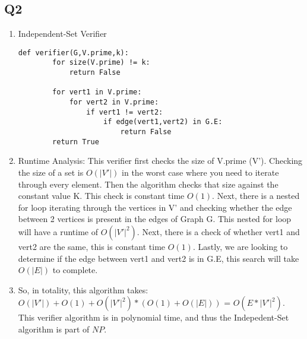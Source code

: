 \documentclass{article}
\begin{document}
\subsection*{Q2}
\begin{enumerate}[label=(\alph*)]
    \item Independent-Set Verifier
    \begin{lstlisting}[frame=single]
    def verifier(G,V.prime,k):
        for size(V.prime) != k:
            return False
        
        for vert1 in V.prime:
            for vert2 in V.prime:
                if vert1 != vert2:
                    if edge(vert1,vert2) in G.E:
                        return False
        return True
    \end{lstlisting}
    \item Runtime Analysis: This verifier first checks the size of V.prime (V'). Checking the size of a set is $O(|V'|)$ in the worst case where you need to iterate through every element. Then the algorithm checks that size against the constant value K. This check is constant time $O(1)$. Next, there is a nested for loop iterating through the vertices in V' and checking whether the edge between 2 vertices is present in the edges of Graph G. This nested for loop will have a runtime of $O(|V'|^{2})$. Next, there is a check of whether vert1 and vert2 are the same, this is constant time $O(1)$. Lastly, we are looking to determine if the edge between vert1 and vert2 is in G.E, this search will take $O(|E|)$ to complete. 
    \item So, in totality, this algorithm takes: $O(|V'|) + O(1) + O(|V'|^2) * (O(1)+O(|E|))$ = $O(E*|V'|^2)$. This verifier algorithm is in polynomial time, and thus the Indepedent-Set algorithm is part of $NP$.
\end{enumerate}

\end{document}
